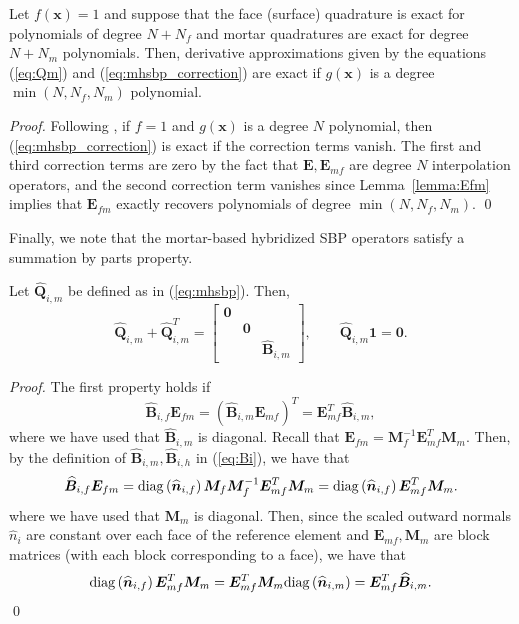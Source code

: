 \documentclass{svjour3}                     %
\renewcommand{\hat}{\widehat}
\newcommand{\diag}[1]{{\rm diag}\LRp{#1}}
\newcommand{\LRp}[1]{\left( #1 \right)}
\begin{document}
\begin{lemma}
Let $f(\bm{x}) = 1$ and suppose that the face (surface) quadrature is exact for polynomials of degree $N+N_f$ and mortar quadratures are exact for degree $N+N_m$ polynomials.  Then, derivative approximations given by the equations (\ref{eq:Qm}) and (\ref{eq:mhsbp_correction}) are exact if $g(\bm{x})$ is a degree $\min(N,N_f,N_m)$ polynomial.
\end{lemma}
\begin{proof}
Following \cite{chan2017discretely}, if $f = 1$  and $g(\bm{x})$ is a degree $N$ polynomial, then  (\ref{eq:mhsbp_correction}) is exact if the correction terms vanish.  The first and third correction terms are zero by the fact that $\bm{E}, \bm{E}_{mf}$ are degree $N$ interpolation operators, and the second correction term vanishes since Lemma~\ref{lemma:Efm} implies that $\bm{E}_{fm}$ exactly recovers polynomials of degree $\min(N,N_f,N_m)$.
\qed\end{proof}

Finally, we note that the mortar-based hybridized SBP operators satisfy a summation by parts property.
\begin{lemma}
\label{lemma:mhsbp}
Let $\hat{\bm{Q}}_{i,m}$ be defined as in (\ref{eq:mhsbp}).  Then, 
\[
\hat{\bm{Q}}_{i,m} + \hat{\bm{Q}}_{i,m}^T = \begin{bmatrix}
\bm{0} && \\
&\bm{0} &\\
&& \hat{\bm{B}}_{i,m}\end{bmatrix}, \qquad \hat{\bm{Q}}_{i,m}\bm{1} = \bm{0}.
\]
\end{lemma}
\begin{proof}
The first property holds if 
\begin{equation}
\hat{\bm{B}}_{i,f} \bm{E}_{fm} = (\hat{\bm{B}}_{i,m} \bm{E}_{mf})^T = \bm{E}_{mf}^T\hat{\bm{B}}_{i,m},  
\label{eq:mhsbpprop}
\end{equation}
where we have used that $\hat{\bm{B}}_{i,m}$ is diagonal.  Recall that $\bm{E}_{fm} = \bm{M}_f^{-1}\bm{E}_{mf}^T\bm{M}_m$.  
Then, by the definition of $\hat{\bm{B}}_{i,m}, \hat{\bm{B}}_{i,h}$ in (\ref{eq:Bi}), we have that
\begin{align*}
\hat{\bm{B}}_{i,f} \bm{E}_{fm} = \diag{\hat{\bm{n}}_{i,f}}\bm{M}_f \bm{M}_f^{-1} \bm{E}_{mf}^T\bm{M}_m 
= \diag{\hat{\bm{n}}_{i,f}} \bm{E}_{mf}^T\bm{M}_m.
\end{align*}
where we have used that $\bm{M}_m$ is diagonal.  Then, since the scaled outward normals $\hat{n}_i$  are constant over each face of the reference element and $\bm{E}_{mf}, \bm{M}_m$ are block matrices (with each block corresponding to a face), we have that
\[
\diag{\hat{\bm{n}}_{i,f}} \bm{E}_{mf}^T\bm{M}_m =\bm{E}_{mf}^T\bm{M}_m \diag{\hat{\bm{n}}_{i,m}}= \bm{E}_{mf}^T\hat{\bm{B}}_{i,m}.
\]  
\qed\end{proof}
\end{document}
